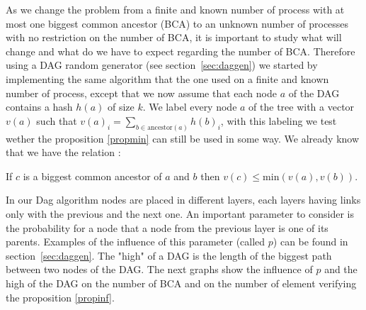 As we change the problem from a finite and known number of process with at most one biggest common ancestor (BCA) to an unknown number of processes with no restriction on the number of BCA, it is important to study what will change and what do we have to expect regarding the number of BCA. Therefore using a DAG random generator (see section~\ref{sec:daggen}) we started by implementing the same algorithm that the one used on a finite and known number of process, except that we now assume that each node $a$ of the DAG contains a hash $h(a)$ of size $k$. We label every node $a$ of the tree with a vector $v(a)$ such that $v(a)_i=\sum_{b\in \mathrm{ancestor}(a)} h(b)_i$, with this labeling we test wether the proposition \ref{propmin} can still be used in some way. We already know that we have the relation :
\begin{proposition}
 If $c$ is a biggest common ancestor of $a$ and $b$ then $v(c) \leq \mathrm{min}(v(a),v(b))$. \label{propinf}
\end{proposition}
In our Dag algorithm nodes are placed in different layers, each layers having links only with the previous and the next one. An important parameter to consider is the probability for a node that a node from the previous layer is one of its parents. Examples of the influence of this parameter (called $p$) can be found in section~\ref{sec:daggen}. The "high" of a DAG is the length of the biggest path between two nodes of the DAG. The next graphs show the influence of $p$ and the high of the DAG on the number of BCA and on the number of element verifying the proposition \ref{propinf}.
